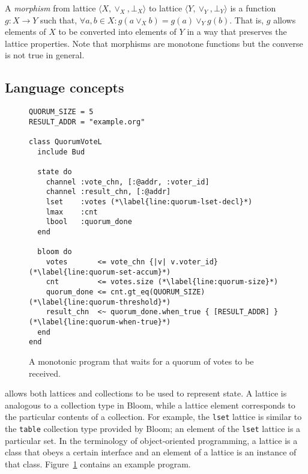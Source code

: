 A \emph{morphism} from lattice $\langle X, \lor_X, \bot_X\rangle$ to lattice
$\langle Y, \lor_Y, \bot_Y\rangle$ is a function $g: X \to Y$ such that,
$\forall a,b \in X: g(a \lor_X b) = g(a) \lor_Y g(b)$. That is, $g$ allows
elements of $X$ to be converted into elements of $Y$ in a way that preserves the
lattice properties.  Note that morphisms are monotone functions but the converse
is not true in general.

\subsection{Language concepts}
\begin{figure}[t]
\begin{scriptsize}
\begin{lstlisting}
QUORUM_SIZE = 5
RESULT_ADDR = "example.org"

class QuorumVoteL
  include Bud

  state do
    channel :vote_chn, [:@addr, :voter_id]
    channel :result_chn, [:@addr]
    lset    :votes (*\label{line:quorum-lset-decl}*)
    lmax    :cnt
    lbool   :quorum_done
  end

  bloom do
    votes       <= vote_chn {|v| v.voter_id} (*\label{line:quorum-set-accum}*)
    cnt         <= votes.size (*\label{line:quorum-size}*)
    quorum_done <= cnt.gt_eq(QUORUM_SIZE) (*\label{line:quorum-threshold}*)
    result_chn  <~ quorum_done.when_true { [RESULT_ADDR] } (*\label{line:quorum-when-true}*)
  end
end
\end{lstlisting}
\end{scriptsize}
\caption{A monotonic \lang program that waits for a quorum of votes to be received.}
\label{fig:lattice-quorum}
\end{figure}

\lang allows both lattices and collections to be used to represent state. A
lattice is analogous to a collection type in Bloom, while a lattice element
corresponds to the particular contents of a collection. For example, the
\texttt{lset} lattice is similar to the \texttt{table} collection type provided
by Bloom; an element of the \texttt{lset} lattice is a particular set. In the
terminology of object-oriented programming, a lattice is a class that obeys a
certain interface and an element of a lattice is an instance of that
class. Figure~\ref{fig:lattice-quorum} contains an example \lang program.

